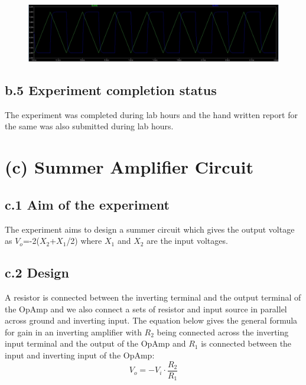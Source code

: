 \documentclass[12pt]{article}
\begin{document}
\begin{figure}[h!]
\centering
\includegraphics[scale = 0.6]{Sim_1_b_2.jpg}
\end{figure}

\subsection*{b.5 Experiment completion status}
The experiment was completed during lab hours and the hand written report for the same was also submitted during lab hours.

\newpage

\section*{(c) Summer Amplifier Circuit}

\subsection*{c.1 Aim of the experiment}
The experiment aims to design a summer circuit which gives the output voltage as $V_{o}$=-2($X_{2}$+$X_{1}$/2) where $X_{1}$ and $X_{2}$ are the input voltages.

\subsection*{c.2 Design}
A resistor is connected between the inverting terminal and the output terminal of the OpAmp and we also connect a sets of resistor and input source in parallel across ground and inverting input. 
The equation below gives the general formula for gain in an inverting amplifier with $R_{2}$ being connected across the inverting input terminal and the output of the OpAmp and $R_{1}$ is connected between the input and inverting input of the OpAmp:
 \begin{equation}
     V_{o} = - V_{i}\cdot\frac{R_{2}}{R_{1}}
 \end{equation}     
 
\end{document}
